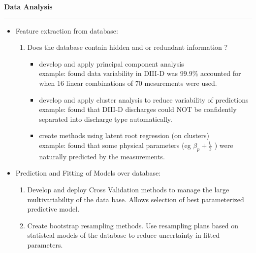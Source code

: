\documentclass{slides}
\begin{document}
      \begin{slide}   \selectfont \tiny
       \begin{center}
           \Large\bfseries Data Analysis

        \end{center}

        \bigskip
        \hrule height4pt
          \bf
         \begin{itemize}
           \item Feature extraction from database: 
              \begin{enumerate}
                 \item Does the database contain hidden and or 
                 redundant information ?
                    \begin{itemize}
                       \item develop and apply principal component
                         analysis \\
                          example: found data variability in DIII-D
                          was $99.9\% $ accounted for when 16 linear
                          combinations of 70 mesurements were used.
                        \item develop and apply cluster analysis to
                          reduce variability of predictions \\
                            example: found that DIII-D discharges
                            could NOT  be confidently separated into
                            discharge type automatically.
                       \item  create methods using 
                         latent root regression (on clusters) \\
                         example: found that some physical parameters
                        (eg $ \beta_p +\frac{l_i}{2}$ ) were naturally
                        predicted by the measurements. 
                    \end{itemize}
              \end{enumerate}
            \item Prediction and Fitting of Models over database:
                  \begin{enumerate}
                     \item Develop and deploy Cross Validation methods 
                       to manage the large multivariability of the 
                       data base. Allows selection of best
                       parameterized predictive model.
                     \item Create bootstrap resampling methods. Use
                       resampling plans based on statistcal models of
                       the database to reduce uncertainty in fitted
                       parameters. 
                    \end{enumerate}
        \end{itemize}
        \end{slide}
\end{document}

